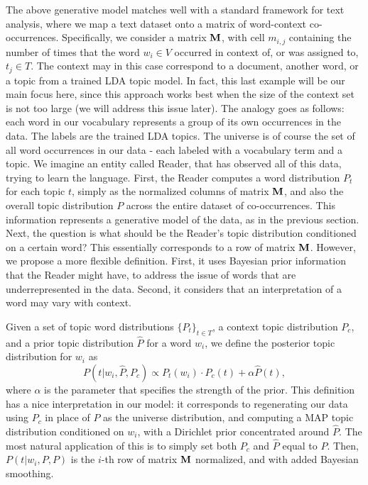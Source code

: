 \documentclass{article}
\begin{document}
The above generative model matches well with a standard framework for
text analysis, where we map a text dataset onto a matrix of
word-context co-occurrences. Specifically, we consider a matrix $\operatorname{\mathbf{M}}$,
with cell $m_{i,j}$ containing the number of times that the word $w_i\in V$ 
occurred in context of, or was assigned to, $t_j\in T$. The context may
in this case correspond to a document, another word, or a topic
from a trained LDA topic model. In fact, this last example will be our main
focus here, since this approach works best when the size of the
context set is not too large (we will address this issue later). The
analogy goes as follows: each word in our vocabulary 
represents a group of its own occurrences in the data. The labels are
the trained LDA topics. The universe
is of course the set of all word occurrences in our data - each
labeled with a vocabulary term and a topic. We imagine an entity
called Reader, that has observed all of this data, trying to learn the
language. First, the Reader computes a word distribution $P_t$ for each
topic $t$, simply as the normalized columns of matrix $\operatorname{\mathbf{M}}$, and also
the overall topic distribution $P$ across the entire dataset of 
co-occurrences. This information represents a generative model of the
data, as in the previous section. Next, the question is what should be
the Reader's topic distribution conditioned on a certain word? This
essentially corresponds to a row of matrix $\operatorname{\mathbf{M}}$. However, we propose
a more flexible definition. First, it uses Bayesian prior
information that the Reader might have, to address the issue of words
that are underrepresented in the data. Second, it considers that an
interpretation of a word may vary with context.

\bed
Given a set of topic word distributions $\{P_t\}_{t\in T}$, a context topic
distribution $P_c$, and a prior topic distribution $\widehat{P}$ for a word $w_i$,
we define the posterior topic distribution for $w_i$ as
\[P(t|w_i,\widehat{P},P_c) \propto P_t(w_i)\cdot P_c(t) + \alpha
\widehat{P}(t),\]
where $\alpha$ is the parameter that specifies the strength of the prior.
\eed
This definition has a nice interpretation in our model: it corresponds
to regenerating our data using $P_c$ in place of $P$ as the
universe distribution, and computing a MAP topic distribution
conditioned on $w_i$, with a Dirichlet prior concentrated around
$\widehat{P}$. The most natural application of this is to simply set
both $P_c$ and $\widehat{P}$ equal to $P$. Then, $P(t|w_i,P,P)$ is the
$i$-th row of matrix $\operatorname{\mathbf{M}}$ normalized, and with added Bayesian
smoothing. 
\end{document}
